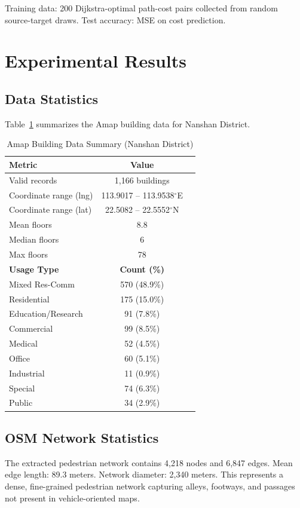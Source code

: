 \documentclass[journal]{IEEEtran}
\begin{document}
Training data: 200 Dijkstra-optimal path-cost pairs collected from random source-target draws. Test accuracy: MSE on cost prediction.

\section{Experimental Results}
\label{sec:results}

\subsection{Data Statistics}
Table~\ref{tab:building_stats} summarizes the Amap building data for Nanshan District.

\begin{table}[!h]
\caption{Amap Building Data Summary (Nanshan District)}
\label{tab:building_stats}
\centering
\begin{tabular}{lcc}
\toprule
\textbf{Metric} & \textbf{Value} \\
\midrule
Valid records & 1,166 buildings \\
Coordinate range (lng) & 113.9017 -- 113.9538$^\circ$E \\
Coordinate range (lat) & 22.5082 -- 22.5552$^\circ$N \\
Mean floors & 8.8 \\
Median floors & 6 \\
Max floors & 78 \\
\midrule
\textbf{Usage Type} & \textbf{Count (\%)} \\
\midrule
Mixed Res-Comm & 570 (48.9\%) \\
Residential & 175 (15.0\%) \\
Education/Research & 91 (7.8\%) \\
Commercial & 99 (8.5\%) \\
Medical & 52 (4.5\%) \\
Office & 60 (5.1\%) \\
Industrial & 11 (0.9\%) \\
Special & 74 (6.3\%) \\
Public & 34 (2.9\%) \\
\bottomrule
\end{tabular}
\end{table}

\subsection{OSM Network Statistics}
The extracted pedestrian network contains 4,218 nodes and 6,847 edges. Mean edge length: 89.3 meters. Network diameter: 2,340 meters. This represents a dense, fine-grained pedestrian network capturing alleys, footways, and passages not present in vehicle-oriented maps.
\end{document}
